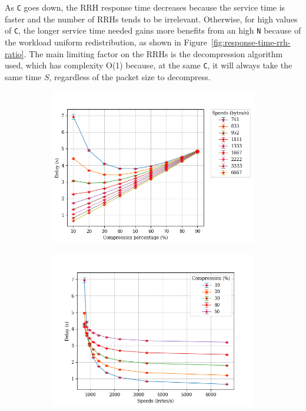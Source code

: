 \documentclass[11pt,a4paper,oneside, openright]{article}
\begin{document}
As \texttt{C} goes down, the RRH response time decreases because the service time is faster and the number of RRHs tends to be irrelevant. Otherwise, for high values of \texttt{C}, the longer service time needed gains more benefits from an high \texttt{N} because of the workload uniform redistribution, as shown in Figure~\ref{fig:response-time-rrh-ratio}.
The main limiting factor on the RRHs is the decompression algorithm used, which has complexity O(1) because, at the same \texttt{C}, it will always take the same time $ S $, regardless of the packet size to decompress.
\begin{figure}[H]
	\centering
	\begin{subfigure}{.5\textwidth}
		\centering
		\includegraphics[width=\linewidth]{images/c-vs-delay-n-30}
		\caption{}
		\label{fig:c-vs-delay-n-30}
	\end{subfigure}%
	\begin{subfigure}{.5\textwidth}
		\centering
		\includegraphics[width=\linewidth]{images/s-vs-delay-n-30}
		\caption{}
		\label{fig:s-vs-delay-n-30}
	\end{subfigure}
	\caption{}
	\label{fig:delay-n-30}
\end{figure}
\end{document}

